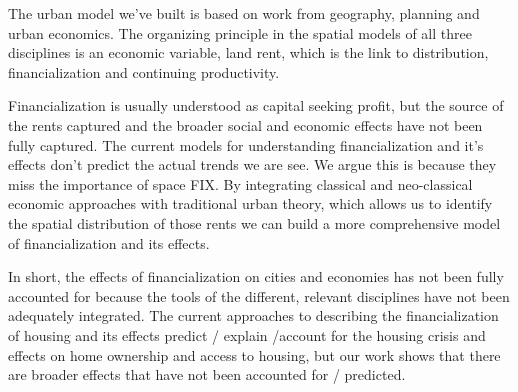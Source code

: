 The urban model we've built is based on work from %
geography, planning and urban economics. The organizing principle in  the spatial models of all three disciplines is an economic variable, land rent, which is the link to distribution, financialization and continuing productivity. %


Financialization is usually understood as capital seeking profit, but the source of the rents captured and the broader social and economic effects have not been fully captured. The current models for understanding financialization and it's effects don't predict the actual trends we are see. We argue this is because they miss the importance of space FIX. 
By integrating classical and neo-classical economic approaches with traditional urban theory, which allows us to identify the spatial distribution of those rents we can build a more comprehensive model of financialization and its effects. 

In short, the effects of financialization on cities and economies has not been fully accounted for because the tools of the different, relevant disciplines have not been adequately integrated. The current approaches to describing the financialization of housing and its effects predict / explain /account for the housing crisis and effects on home ownership and access to housing, but our work shows that there are broader effects that have not been accounted for / predicted. 

